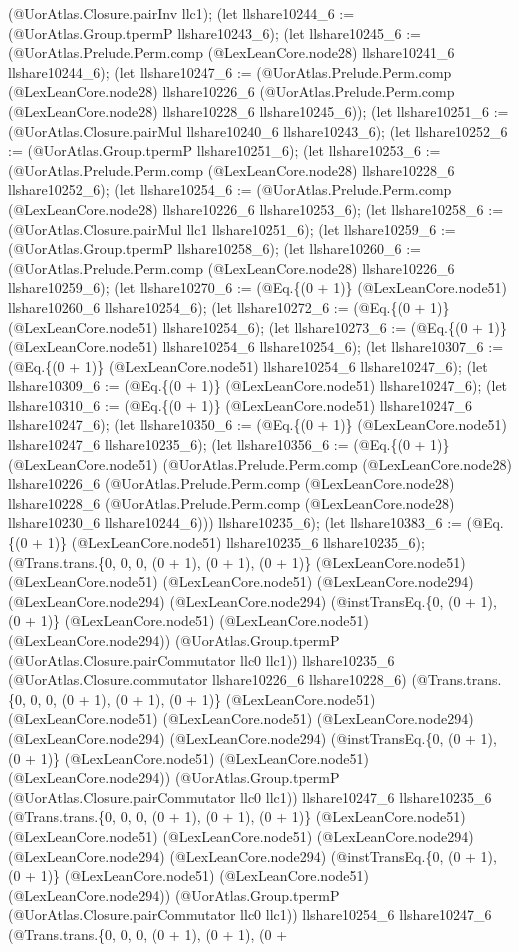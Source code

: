 \documentclass[11pt]{article}
\begin{document}
(@UorAtlas.Closure.pairInv llc1); (let llshare10244\_6 := (@UorAtlas.Group.tpermP llshare10243\_6); (let llshare10245\_6 := (@UorAtlas.Prelude.Perm.comp (@LexLeanCore.node28) llshare10241\_6 llshare10244\_6); (let llshare10247\_6 := (@UorAtlas.Prelude.Perm.comp (@LexLeanCore.node28) llshare10226\_6 (@UorAtlas.Prelude.Perm.comp (@LexLeanCore.node28) llshare10228\_6 llshare10245\_6)); (let llshare10251\_6 := (@UorAtlas.Closure.pairMul llshare10240\_6 llshare10243\_6); (let llshare10252\_6 := (@UorAtlas.Group.tpermP llshare10251\_6); (let llshare10253\_6 := (@UorAtlas.Prelude.Perm.comp (@LexLeanCore.node28) llshare10228\_6 llshare10252\_6); (let llshare10254\_6 := (@UorAtlas.Prelude.Perm.comp (@LexLeanCore.node28) llshare10226\_6 llshare10253\_6); (let llshare10258\_6 := (@UorAtlas.Closure.pairMul llc1 llshare10251\_6); (let llshare10259\_6 := (@UorAtlas.Group.tpermP llshare10258\_6); (let llshare10260\_6 := (@UorAtlas.Prelude.Perm.comp (@LexLeanCore.node28) llshare10226\_6 llshare10259\_6); (let llshare10270\_6 := (@Eq.\{(0 + 1)\} (@LexLeanCore.node51) llshare10260\_6 llshare10254\_6); (let llshare10272\_6 := (@Eq.\{(0 + 1)\} (@LexLeanCore.node51) llshare10254\_6); (let llshare10273\_6 := (@Eq.\{(0 + 1)\} (@LexLeanCore.node51) llshare10254\_6 llshare10254\_6); (let llshare10307\_6 := (@Eq.\{(0 + 1)\} (@LexLeanCore.node51) llshare10254\_6 llshare10247\_6); (let llshare10309\_6 := (@Eq.\{(0 + 1)\} (@LexLeanCore.node51) llshare10247\_6); (let llshare10310\_6 := (@Eq.\{(0 + 1)\} (@LexLeanCore.node51) llshare10247\_6 llshare10247\_6); (let llshare10350\_6 := (@Eq.\{(0 + 1)\} (@LexLeanCore.node51) llshare10247\_6 llshare10235\_6); (let llshare10356\_6 := (@Eq.\{(0 + 1)\} (@LexLeanCore.node51) (@UorAtlas.Prelude.Perm.comp (@LexLeanCore.node28) llshare10226\_6 (@UorAtlas.Prelude.Perm.comp (@LexLeanCore.node28) llshare10228\_6 (@UorAtlas.Prelude.Perm.comp (@LexLeanCore.node28) llshare10230\_6 llshare10244\_6))) llshare10235\_6); (let llshare10383\_6 := (@Eq.\{(0 + 1)\} (@LexLeanCore.node51) llshare10235\_6 llshare10235\_6); (@Trans.trans.\{0, 0, 0, (0 + 1), (0 + 1), (0 + 1)\} (@LexLeanCore.node51) (@LexLeanCore.node51) (@LexLeanCore.node51) (@LexLeanCore.node294) (@LexLeanCore.node294) (@LexLeanCore.node294) (@instTransEq.\{0, (0 + 1), (0 + 1)\} (@LexLeanCore.node51) (@LexLeanCore.node51) (@LexLeanCore.node294)) (@UorAtlas.Group.tpermP (@UorAtlas.Closure.pairCommutator llc0 llc1)) llshare10235\_6 (@UorAtlas.Closure.commutator llshare10226\_6 llshare10228\_6) (@Trans.trans.\{0, 0, 0, (0 + 1), (0 + 1), (0 + 1)\} (@LexLeanCore.node51) (@LexLeanCore.node51) (@LexLeanCore.node51) (@LexLeanCore.node294) (@LexLeanCore.node294) (@LexLeanCore.node294) (@instTransEq.\{0, (0 + 1), (0 + 1)\} (@LexLeanCore.node51) (@LexLeanCore.node51) (@LexLeanCore.node294)) (@UorAtlas.Group.tpermP (@UorAtlas.Closure.pairCommutator llc0 llc1)) llshare10247\_6 llshare10235\_6 (@Trans.trans.\{0, 0, 0, (0 + 1), (0 + 1), (0 + 1)\} (@LexLeanCore.node51) (@LexLeanCore.node51) (@LexLeanCore.node51) (@LexLeanCore.node294) (@LexLeanCore.node294) (@LexLeanCore.node294) (@instTransEq.\{0, (0 + 1), (0 + 1)\} (@LexLeanCore.node51) (@LexLeanCore.node51) (@LexLeanCore.node294)) (@UorAtlas.Group.tpermP (@UorAtlas.Closure.pairCommutator llc0 llc1)) llshare10254\_6 llshare10247\_6 (@Trans.trans.\{0, 0, 0, (0 + 1), (0 + 1), (0 + 
\end{document}
